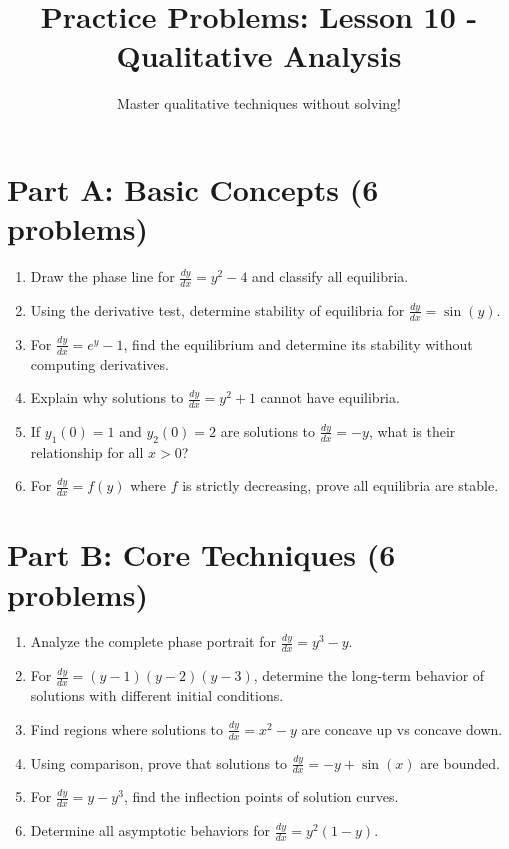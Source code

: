 \documentclass[12pt]{article}
\title{Practice Problems: Lesson 10 - Qualitative Analysis}
\author{Master qualitative techniques without solving!}
\date{}
\begin{document}
\maketitle

\section*{Part A: Basic Concepts (6 problems)}

\begin{enumerate}
\item Draw the phase line for $\frac{dy}{dx} = y^2 - 4$ and classify all equilibria.

\item Using the derivative test, determine stability of equilibria for $\frac{dy}{dx} = \sin(y)$.

\item For $\frac{dy}{dx} = e^y - 1$, find the equilibrium and determine its stability without computing derivatives.

\item Explain why solutions to $\frac{dy}{dx} = y^2 + 1$ cannot have equilibria.

\item If $y_1(0) = 1$ and $y_2(0) = 2$ are solutions to $\frac{dy}{dx} = -y$, what is their relationship for all $x > 0$?

\item For $\frac{dy}{dx} = f(y)$ where $f$ is strictly decreasing, prove all equilibria are stable.
\end{enumerate}

\section*{Part B: Core Techniques (6 problems)}

\begin{enumerate}[resume]
\item Analyze the complete phase portrait for $\frac{dy}{dx} = y^3 - y$.

\item For $\frac{dy}{dx} = (y-1)(y-2)(y-3)$, determine the long-term behavior of solutions with different initial conditions.

\item Find regions where solutions to $\frac{dy}{dx} = x^2 - y$ are concave up vs concave down.

\item Using comparison, prove that solutions to $\frac{dy}{dx} = -y + \sin(x)$ are bounded.

\item For $\frac{dy}{dx} = y - y^3$, find the inflection points of solution curves.

\item Determine all asymptotic behaviors for $\frac{dy}{dx} = y^2(1-y)$.
\end{enumerate}
\end{document}
